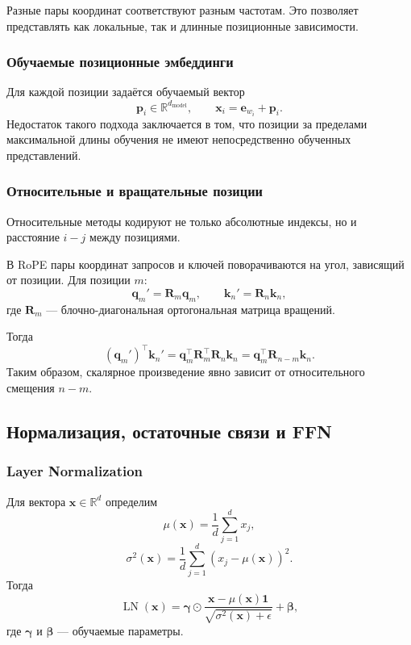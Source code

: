 \documentclass[12pt,a4paper]{article}
\theoremstyle{definition}
\newcommand{\R}{\mathbb{R}}
\newcommand{\1}{\mathbf{1}}
\begin{document}
Разные пары координат соответствуют разным частотам. Это позволяет
представлять как локальные, так и длинные позиционные зависимости.

\subsubsection{Обучаемые позиционные эмбеддинги}

Для каждой позиции задаётся обучаемый вектор
\[
    \bm{p}_i\in\R^{d_{\text{model}}},
    \qquad
    \bm{x}_i=\bm{e}_{w_i}+\bm{p}_i.
\]
Недостаток такого подхода заключается в том, что позиции за пределами
максимальной длины обучения не имеют непосредственно обученных
представлений.

\subsubsection{Относительные и вращательные позиции}

Относительные методы кодируют не только абсолютные индексы, но и
расстояние $i-j$ между позициями.

В RoPE пары координат запросов и ключей поворачиваются на угол,
зависящий от позиции. Для позиции $m$:
\[
    \bm{q}_m'=\bm{R}_m\bm{q}_m,
    \qquad
    \bm{k}_n'=\bm{R}_n\bm{k}_n,
\]
где $\bm{R}_m$ --- блочно-диагональная ортогональная матрица вращений.

Тогда
\[
    (\bm{q}_m')^\top\bm{k}_n'
    =
    \bm{q}_m^\top\bm{R}_m^\top\bm{R}_n\bm{k}_n
    =
    \bm{q}_m^\top\bm{R}_{n-m}\bm{k}_n.
\]
Таким образом, скалярное произведение явно зависит от относительного
смещения $n-m$.

\subsection{Нормализация, остаточные связи и FFN}

\subsubsection{Layer Normalization}

Для вектора $\bm{x}\in\R^d$ определим
\[
    \mu(\bm{x})=\frac{1}{d}\sum_{j=1}^{d}x_j,
\]
\[
    \sigma^2(\bm{x})
    =
    \frac{1}{d}\sum_{j=1}^{d}(x_j-\mu(\bm{x}))^2.
\]
Тогда
\[
    \operatorname{LN}(\bm{x})
    =
    \bm{\gamma}\odot
    \frac{\bm{x}-\mu(\bm{x})\bm{1}}
         {\sqrt{\sigma^2(\bm{x})+\epsilon}}
    +
    \bm{\beta},
\]
где $\bm{\gamma}$ и $\bm{\beta}$ --- обучаемые параметры.
\end{document}

